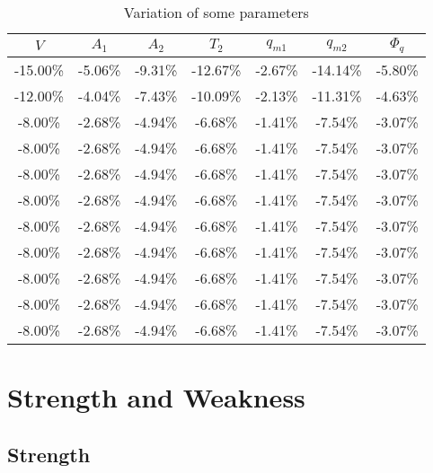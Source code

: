 \documentclass{mcmthesis}
\begin{document}
\begin{table}[h] %
\centering  %
\caption{Variation of some parameters}  %
\label{tab7} %
\begin{tabular}{ccccccc} %
\toprule  %
$V$      & $A_1$   & $A_2$   & $T_2$    & $q_{m1}$ & $q_{m2}$ & $\Phi_q$ \\
\midrule  %
-15.00\% & -5.06\% & -9.31\% & -12.67\% & -2.67\%  & -14.14\% & -5.80\% \\
-12.00\% & -4.04\% & -7.43\% & -10.09\% & -2.13\%  & -11.31\% & -4.63\% \\
-8.00\%  & -2.68\% & -4.94\% & -6.68\%  & -1.41\%  & -7.54\%  & -3.07\% \\
-8.00\%  & -2.68\% & -4.94\% & -6.68\%  & -1.41\%  & -7.54\%  & -3.07\% \\
-8.00\%  & -2.68\% & -4.94\% & -6.68\%  & -1.41\%  & -7.54\%  & -3.07\% \\
-8.00\%  & -2.68\% & -4.94\% & -6.68\%  & -1.41\%  & -7.54\%  & -3.07\% \\
-8.00\%  & -2.68\% & -4.94\% & -6.68\%  & -1.41\%  & -7.54\%  & -3.07\% \\
-8.00\%  & -2.68\% & -4.94\% & -6.68\%  & -1.41\%  & -7.54\%  & -3.07\% \\
-8.00\%  & -2.68\% & -4.94\% & -6.68\%  & -1.41\%  & -7.54\%  & -3.07\% \\
-8.00\%  & -2.68\% & -4.94\% & -6.68\%  & -1.41\%  & -7.54\%  & -3.07\% \\
-8.00\%  & -2.68\% & -4.94\% & -6.68\%  & -1.41\%  & -7.54\%  & -3.07\% \\
\bottomrule  %
\end{tabular}
\end{table}

\section{Strength and Weakness}

\subsection{Strength}
\end{document}
